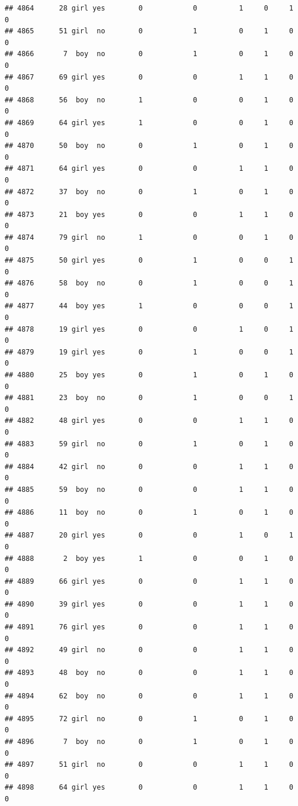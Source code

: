 \documentclass[man]{apa6}
\begin{document}
\begin{verbatim}
## 4864      28 girl yes        0            0          1     0     1     0
## 4865      51 girl  no        0            1          0     1     0     0
## 4866       7  boy  no        0            1          0     1     0     0
## 4867      69 girl yes        0            0          1     1     0     0
## 4868      56  boy  no        1            0          0     1     0     0
## 4869      64 girl yes        1            0          0     1     0     0
## 4870      50  boy  no        0            1          0     1     0     0
## 4871      64 girl yes        0            0          1     1     0     0
## 4872      37  boy  no        0            1          0     1     0     0
## 4873      21  boy yes        0            0          1     1     0     0
## 4874      79 girl  no        1            0          0     1     0     0
## 4875      50 girl yes        0            1          0     0     1     0
## 4876      58  boy  no        0            1          0     0     1     0
## 4877      44  boy yes        1            0          0     0     1     0
## 4878      19 girl yes        0            0          1     0     1     0
## 4879      19 girl yes        0            1          0     0     1     0
## 4880      25  boy yes        0            1          0     1     0     0
## 4881      23  boy  no        0            1          0     0     1     0
## 4882      48 girl yes        0            0          1     1     0     0
## 4883      59 girl  no        0            1          0     1     0     0
## 4884      42 girl  no        0            0          1     1     0     0
## 4885      59  boy  no        0            0          1     1     0     0
## 4886      11  boy  no        0            1          0     1     0     0
## 4887      20 girl yes        0            0          1     0     1     0
## 4888       2  boy yes        1            0          0     1     0     0
## 4889      66 girl yes        0            0          1     1     0     0
## 4890      39 girl yes        0            0          1     1     0     0
## 4891      76 girl yes        0            0          1     1     0     0
## 4892      49 girl  no        0            0          1     1     0     0
## 4893      48  boy  no        0            0          1     1     0     0
## 4894      62  boy  no        0            0          1     1     0     0
## 4895      72 girl  no        0            1          0     1     0     0
## 4896       7  boy  no        0            1          0     1     0     0
## 4897      51 girl  no        0            0          1     1     0     0
## 4898      64 girl yes        0            0          1     1     0     0

\end{verbatim}
\end{document}
